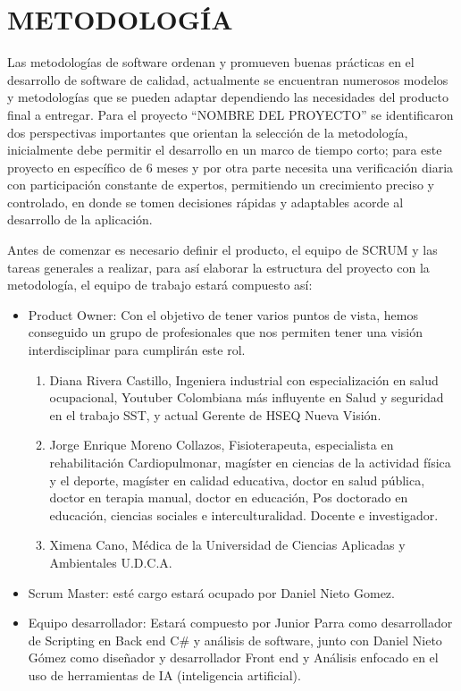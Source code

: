 \chapter{METODOLOGÍA}
Las metodologías de software ordenan y promueven buenas prácticas en el desarrollo de software de calidad, actualmente se encuentran numerosos modelos y metodologías que se pueden adaptar dependiendo las necesidades del producto final a entregar\parencite{Nohemy2015ESCOGERDECISION}. Para el proyecto “NOMBRE DEL PROYECTO” se identificaron dos perspectivas importantes que orientan la selección de la metodología, inicialmente debe permitir el desarrollo en un marco de tiempo corto; para este proyecto en específico de 6 meses y por otra parte necesita una verificación diaria con participación constante de expertos, permitiendo un crecimiento preciso y controlado, en donde se tomen decisiones rápidas y adaptables acorde al desarrollo de la aplicación.


Antes de comenzar es necesario definir el producto, el equipo de SCRUM y las tareas generales a realizar, para así elaborar la estructura del proyecto con la metodología, el equipo de trabajo estará compuesto así: 
\begin{itemize}
    \item Product Owner:  Con el objetivo de tener varios puntos de vista, hemos conseguido un grupo de profesionales que nos permiten tener una visión interdisciplinar para cumplirán este rol.
    \begin{enumerate}
        \item Diana Rivera Castillo, Ingeniera industrial con especialización en salud ocupacional, Youtuber Colombiana más influyente en Salud y seguridad en el trabajo SST, y actual Gerente de HSEQ Nueva Visión.
        \item Jorge Enrique Moreno Collazos, Fisioterapeuta, especialista en rehabilitación Cardiopulmonar, magíster en ciencias de la actividad física y el deporte, magíster en calidad educativa, doctor en salud pública, doctor en terapia manual, doctor en educación, Pos doctorado en educación, ciencias sociales e interculturalidad. Docente e investigador.
        \item Ximena Cano, Médica de la Universidad de Ciencias Aplicadas y Ambientales U.D.C.A. 
    \end{enumerate}

\item Scrum Master: esté cargo estará ocupado por Daniel Nieto Gomez.
\item Equipo desarrollador: Estará compuesto por Junior Parra como desarrollador de Scripting en Back end C\# y análisis de software, junto con Daniel Nieto Gómez como diseñador y desarrollador Front end y Análisis enfocado en el uso de herramientas de IA (inteligencia artificial). 
\end{itemize}

